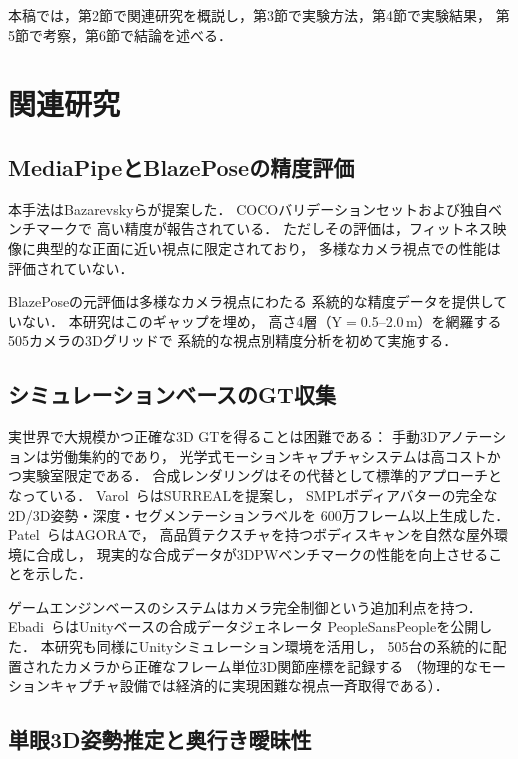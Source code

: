 \documentclass[fleqn]{ieej}
\begin{document}
本稿では，第2節で関連研究を概説し，第3節で実験方法，第4節で実験結果，
第5節で考察，第6節で結論を述べる．

\section{関連研究}

\subsection{MediaPipeとBlazePoseの精度評価}

本手法はBazarevskyら\cite{blazepose}が提案した．
COCOバリデーションセットおよび独自ベンチマークで
高い精度が報告されている．
ただしその評価は，フィットネス映像に典型的な正面に近い視点に限定されており，
多様なカメラ視点での性能は評価されていない．

BlazePoseの元評価\cite{blazepose}は多様なカメラ視点にわたる
系統的な精度データを提供していない．
本研究はこのギャップを埋め，
高さ4層（Y$=$0.5--2.0\,m）を網羅する505カメラの3Dグリッドで
系統的な視点別精度分析を初めて実施する．

\subsection{シミュレーションベースのGT収集}

実世界で大規模かつ正確な3D GTを得ることは困難である：
手動3Dアノテーションは労働集約的であり，
光学式モーションキャプチャシステムは高コストかつ実験室限定である．
合成レンダリングはその代替として標準的アプローチとなっている．
Varol~ら\cite{surreal}はSURREALを提案し，
SMPLボディアバターの完全な2D/3D姿勢・深度・セグメンテーションラベルを
600万フレーム以上生成した．
Patel~ら\cite{agora}はAGORAで，
高品質テクスチャを持つボディスキャンを自然な屋外環境に合成し，
現実的な合成データが3DPWベンチマークの性能を向上させることを示した．

ゲームエンジンベースのシステムはカメラ完全制御という追加利点を持つ．
Ebadi~ら\cite{peoplesanspeople}はUnityベースの合成データジェネレータ
PeopleSansPeopleを公開した．
本研究も同様にUnityシミュレーション環境を活用し，
505台の系統的に配置されたカメラから正確なフレーム単位3D関節座標を記録する
（物理的なモーションキャプチャ設備では経済的に実現困難な視点一斉取得である）．

\subsection{単眼3D姿勢推定と奥行き曖昧性}
\end{document}
